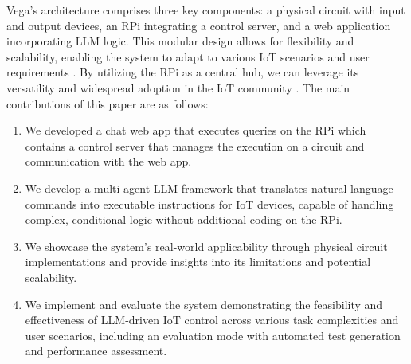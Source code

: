 \documentclass{ieeeaccess}
\begin{document}
Vega's architecture comprises three key components: a physical circuit with input and output devices, an RPi integrating a control server, and a web application incorporating LLM logic. This modular design allows for flexibility and scalability, enabling the system to adapt to various IoT scenarios and user requirements \cite{taylor2010software}. By utilizing the RPi as a central hub, we can leverage its versatility and widespread adoption in the IoT community \cite{8067944}. The main contributions of this paper are as follows:


\begin{enumerate}
\item We developed a chat web app that executes queries on the RPi which contains a control server that manages the execution on a circuit and communication with the web app.
\item We develop a multi-agent LLM framework that translates natural language commands into executable instructions for IoT devices, capable of handling complex, conditional logic without additional coding on the RPi.
\item We showcase the system's real-world applicability through physical circuit implementations and provide insights into its limitations and potential scalability.
\item We implement and evaluate the system demonstrating the feasibility and effectiveness of LLM-driven IoT control across various task complexities and user scenarios, including an evaluation mode with automated test generation and performance assessment.
\end{enumerate}

\end{document}
